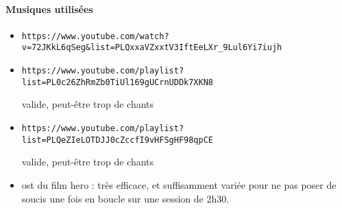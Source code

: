 \documentclass[10pt,a4paper]{book}
\begin{document}
\paragraph{Musiques utilisées}
\begin{itemize}
\item \begin{verbatim}https://www.youtube.com/watch?v=72JKkL6qSeg&list=PLQxxaVZxxtV3IftEeLXr_9Lul6Yi7iujh \end{verbatim}
\item \begin{verbatim}https://www.youtube.com/playlist?list=PL0c26ZhRmZb0TiUl169gUCrnUDDk7XKN8\end{verbatim} valide, peut-être trop de chants
\item \begin{verbatim}https://www.youtube.com/playlist?list=PLQeZIeLOTDJJ0cZccfI9vHFSgHF98qpCE\end{verbatim} valide, peut-être trop de chants
\item ost du film hero : très efficace, et suffisamment variée pour ne pas poser de soucis une fois en boucle sur une session de 2h30.
\end{itemize}
\end{document}
